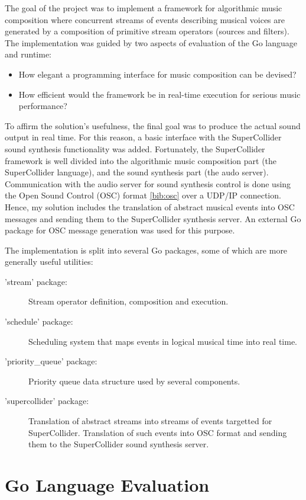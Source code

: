 \documentclass {article}
\begin{document}
The goal of the project was to implement a framework for algorithmic music composition where concurrent streams of events describing musical voices are generated by a composition of primitive stream operators (sources and filters). The implementation was guided by two aspects of evaluation of the Go language and runtime:

\begin{itemize}
\item How elegant a programming interface for music composition can be devised?
\item How efficient would the framework be in real-time execution for serious music performance?
\end{itemize}

To affirm the solution's usefulness, the final goal was to produce the actual sound output in real time. For this reason, a basic interface with the SuperCollider sound synthesis functionality was added. Fortunately, the SuperCollider framework is well divided into the algorithmic music composition part (the SuperCollider language), and the sound synthesis part (the audo server). Communication with the audio server for sound synthesis control is done using the Open Sound Control (OSC) format \ref{bib:osc} over a UDP/IP connection. Hence, my solution includes the translation of abstract musical events into OSC messages and sending them to the SuperCollider synthesis server. An external Go package for OSC message generation was used for this purpose.

The implementation is split into several Go packages, some of which are more generally useful utilities:

\begin{description}
\item['stream' package:] Stream operator definition, composition and execution.
\item['schedule' package:] Scheduling system that maps events in logical musical time into real time.
\item['priority\_queue' package:] Priority queue data structure used by several components.
\item['supercollider' package:] Translation of abstract streams into streams of events targetted for SuperCollider. Translation of such events into OSC format and sending them to the SuperCollider sound synthesis server.
\end{description}


\section{Go Language Evaluation}
\label{sec:language}
\end{document}
